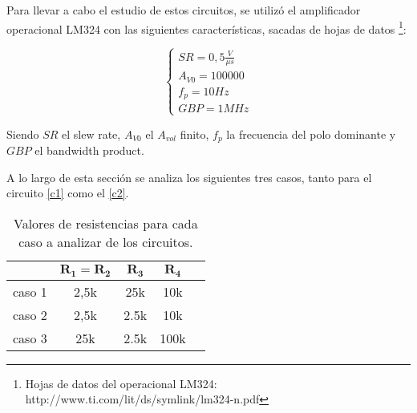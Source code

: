 Para llevar a cabo el estudio
 de estos circuitos, se utilizó el amplificador operacional LM324 con las 
 siguientes características, sacadas de hojas de datos
 \footnote{Hojas de datos del operacional LM324: http://www.ti.com/lit/ds/symlink/lm324-n.pdf}:

 \begin{equation}
	\begin{cases}
		SR = 0,5\frac{V}{\mu s}\\
		A_{V0} = 100000\\
		f_p = 10Hz\\
		GBP = 1MHz
	\end{cases}
	\label{lm324}
\end{equation}

Siendo $SR$ el slew rate, $A_{V0}$ el $A_{vol}$ finito, $f_p$ la frecuencia del polo dominante y $GBP$ el bandwidth product.

A lo largo de esta sección se analiza los siguientes tres casos, tanto para
el circuito \ref{c1} como el \ref{c2}.

\begin{table}[h!]
	\centering
	\begin{tabular}{c c c c c}%
		\bfseries  & $\bm{R_1 = R_2}$ & $\bm{R_3}$ & $\bm{R_4}$  \\ \hline
		caso 1 & 2,5k & 25k & 10k \\
		caso 2 & 2,5k & 2.5k & 10k \\
		caso 3 & 25k & 2.5k & 100k \\
		\hline
	\end{tabular}
	\caption{Valores de resistencias para cada caso a analizar de los circuitos.}
	\label{casos}
\end{table}



























